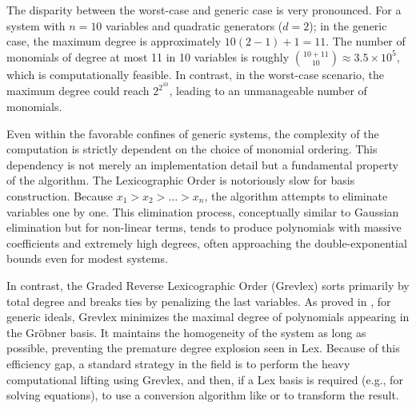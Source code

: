 \begin{remark}
The disparity between the worst-case and generic case is very pronounced. For a system with $n=10$ variables and quadratic generators ($d=2$); in the generic case, the maximum degree is approximately $10(2-1) + 1 = 11$. The number of monomials of degree at most 11 in 10 variables is roughly $\binom{10+11}{10} \approx 3.5 \times 10^5$, which is computationally feasible. In contrast, in the worst-case scenario, the maximum degree could reach $2^{2^{10}}$, leading to an unmanageable number of monomials.
\end{remark}

Even within the favorable confines of generic systems, the complexity of the computation is strictly dependent on the choice of monomial ordering. This dependency is not merely an implementation detail but a fundamental property of the algorithm. The Lexicographic Order is notoriously slow for basis construction. Because $x_1 > x_2 > \dots > x_n$, the algorithm attempts to eliminate variables one by one. This elimination process, conceptually similar to Gaussian elimination but for non-linear terms, tends to produce polynomials with massive coefficients and extremely high degrees, often approaching the double-exponential bounds even for modest systems. 

In contrast, the Graded Reverse Lexicographic Order (Grevlex) sorts primarily by total degree and breaks ties by penalizing the last variables. As proved in \cite{Bayer1987_CriterionForDetectingMRegularity}, for generic ideals, Grevlex minimizes the maximal degree of polynomials appearing in the Gröbner basis. It maintains the homogeneity of the system as long as possible, preventing the premature degree explosion seen in Lex. Because of this efficiency gap, a standard strategy in the field is to perform the heavy computational lifting using Grevlex, and then, if a Lex basis is required (e.g., for solving equations), to use a conversion algorithm like \cite{Gerdt2003_ImplementationFGLM} or \cite{Tran2000_FastAlgorithmForGBConversion} to transform the result.

